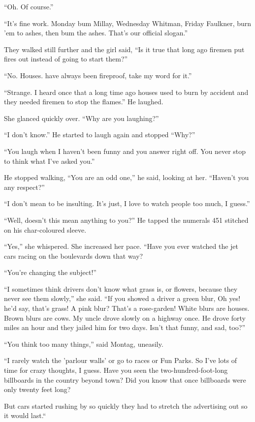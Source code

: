\documentclass[11pt,openany]{book}
\begin{document}
``Oh. Of course.''

``It's fine work. Monday bum Millay, Wednesday Whitman, Friday Faulkner, burn 'em to ashes, then bum the ashes. That's our official slogan.''

They walked still further and the girl said, ``Is it true that long ago firemen put fires out instead of going to start them?''

``No. Houses. have always been fireproof, take my word for it.''

``Strange. I heard once that a long time ago houses used to burn by accident and they needed firemen to stop the flames.'' He laughed.

She glanced quickly over. ``Why are you laughing?''

``I don't know.'' He started to laugh again and stopped ``Why?''

``You laugh when I haven't been funny and you answer right off. You never stop to think what I've asked you.''

He stopped walking, ``You are an odd one,'' he said, looking at her. ``Haven't you any respect?''

``I don't mean to be insulting. It's just, I love to watch people too much, I guess.''

``Well, doesn't this mean anything to you?'' He tapped the numerals 451 stitched on his char-coloured sleeve.

``Yes,'' she whispered. She increased her pace. ``Have you ever watched the jet cars racing on the boulevards down that way?

``You're changing the subject!''

``I sometimes think drivers don't know what grass is, or flowers, because they never see them slowly,'' she said. ``If you showed a driver a green blur, Oh yes! he'd say, that's grass! A pink blur? That's a rose-garden! White blurs are houses. Brown blurs are cows. My uncle drove slowly on a highway once. He drove forty miles an hour and they jailed him for two days. Isn't that funny, and sad, too?''

``You think too many things,'' said Montag, uneasily.

``I rarely watch the 'parlour walls' or go to races or Fun Parks. So I've lots of time for crazy thoughts, I guess. Have you seen the two-hundred-foot-long billboards in the country beyond town? Did you know that once billboards were only twenty feet long?

But cars started rushing by so quickly they had to stretch the advertising out so it would last.``
\end{document}
